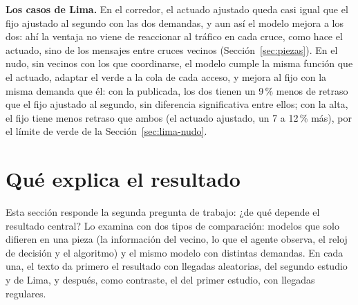 \noindent\textbf{Los casos de Lima.} En el corredor, el actuado
ajustado queda casi igual que el fijo ajustado al segundo con las dos
demandas, y aun así el modelo mejora a los dos: ahí la ventaja no viene
de reaccionar al tráfico en cada cruce, como hace el actuado, sino de
los mensajes entre cruces vecinos (Sección~\ref{sec:piezas}). En el
nudo, sin vecinos con los que coordinarse, el modelo cumple la misma
función que el actuado, adaptar el verde a la cola de cada acceso, y
mejora al fijo con la misma demanda que él: con la publicada, los dos
tienen un 9\,\% menos de retraso que el fijo ajustado al segundo, sin
diferencia significativa entre ellos; con la alta, el fijo tiene menos
retraso que ambos (el actuado ajustado, un 7 a 12\,\% más), por el
límite de verde de la Sección~\ref{sec:lima-nudo}.

\section{Qué explica el resultado}
\label{sec:que-explica}
\suppressfloats[t]

Esta sección responde la segunda pregunta de trabajo: ¿de qué depende el
resultado central? Lo examina con dos tipos de comparación: modelos que
solo difieren en una pieza (la información del vecino, lo que el agente
observa, el reloj de decisión y el algoritmo) y el mismo modelo con
distintas demandas. En cada una, el texto da primero el resultado con
llegadas aleatorias, del segundo estudio y de Lima, y después, como
contraste, el del primer estudio, con llegadas regulares.

